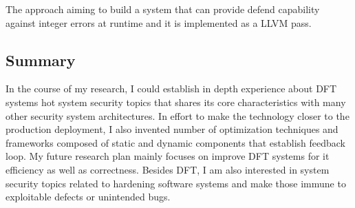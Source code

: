 \documentclass[letterpaper, 10pt]{article}
\begin{document}
\begin{small}
The approach aiming to build a system that can provide defend capability
against integer errors at runtime and it is implemented as a LLVM pass.

\subsection*{Summary}

In the course of my research, I could establish in depth experience about DFT
systems hot system security topics that shares its core characteristics with
many other security system architectures.
%
In effort to make the technology closer to the production deployment, I also
invented number of optimization techniques and frameworks composed of static
and dynamic components that establish feedback loop.
%
My future research plan mainly focuses on improve DFT systems for it efficiency
as well as correctness.
%
Besides DFT, I am also interested in system security topics related to hardening
software systems and make those immune to exploitable defects or unintended bugs. 

\end{small}



\end{document}
